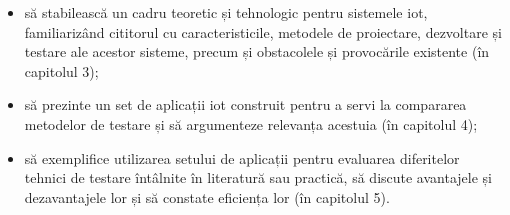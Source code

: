\begin{itemize}
    \item să stabilească un cadru teoretic și tehnologic pentru sistemele \acrshort{iot}, familiarizând cititorul cu caracteristicile, metodele de proiectare, dezvoltare și testare ale acestor sisteme, precum și obstacolele și provocările existente (în capitolul 3);
    
    \item să prezinte un set de aplicații \acrshort{iot} construit pentru a servi la compararea metodelor de testare și să argumenteze relevanța acestuia (în capitolul 4);

    \item să exemplifice utilizarea setului de aplicații pentru evaluarea diferitelor tehnici de testare întâlnite în literatură sau practică, să discute avantajele și dezavantajele lor și să constate eficiența lor (în capitolul 5).
\end{itemize}